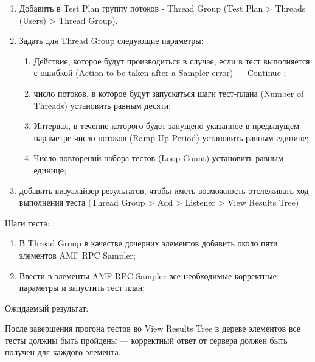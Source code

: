 \begin{enumerate}
\item Добавить в Test Plan группу потоков - Thread Group (Test Plan > Threads (Users) > Thread Group).
\item Задать для Thread Group следующие параметры:

\begin{enumerate}
\item Действие, которое будут производиться в случае, если в тест выполняется с ошибкой
(Action to be taken after a Sampler error) --- Continue ;
\item число потоков, в которое будут запускаться шаги тест-плана (Number of Threads) установить равным десяти;
\item Интервал, в течение которого будет запущено указанное в предыдущем параметре
число потоков (Ramp-Up Period) установить равным единице;
\item Число повторений набора тестов (Loop Count) установить равным единице;
\end{enumerate}

\item добавить визуалайзер результатов, чтобы иметь возможность отслеживать ход выполнения теста (Thread Group >
Add > Listener > View Results Tree)
\end{enumerate}

Шаги теста:

\begin{enumerate}
\item В Thread Group в качестве дочерних элементов добавить около пяти элементов AMF RPC Sampler;
\item Ввести в элементы AMF RPC Sampler все необходимые корректные параметры и запустить тест план;
\end{enumerate}

Ожидаемый результат:

 После завершения прогона тестов во View Results Tree в дереве элементов все тесты должны быть пройдены ---
 корректный ответ от сервера должен быть получен для каждого элемента.

